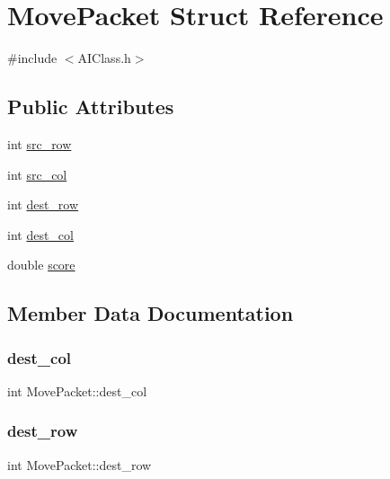 \hypertarget{struct_move_packet}{}\section{Move\+Packet Struct Reference}
\label{struct_move_packet}


{\ttfamily \#include $<$A\+I\+Class.\+h$>$}

\subsection*{Public Attributes}
\begin{DoxyCompactItemize}
\item 
int \hyperlink{struct_move_packet_ac47381c0c93b204e2e9a8251537f0118}{src\+\_\+row}
\item 
int \hyperlink{struct_move_packet_a174bf6f0d24a094e8cd3a8af0547dc9f}{src\+\_\+col}
\item 
int \hyperlink{struct_move_packet_aa4e9c53e9b13bd1e01bcbe36aece9321}{dest\+\_\+row}
\item 
int \hyperlink{struct_move_packet_a76e460ec3c99d9c07e365419bfec9c79}{dest\+\_\+col}
\item 
double \hyperlink{struct_move_packet_ae502e180cfc98f90b24b9d5521f80161}{score}
\end{DoxyCompactItemize}


\subsection{Member Data Documentation}
\mbox{\label{struct_move_packet_a76e460ec3c99d9c07e365419bfec9c79}} 
\subsubsection{\texorpdfstring{dest\+\_\+col}{dest\_col}}
{\footnotesize\ttfamily int Move\+Packet\+::dest\+\_\+col}

\mbox{\label{struct_move_packet_aa4e9c53e9b13bd1e01bcbe36aece9321}} 
\subsubsection{\texorpdfstring{dest\+\_\+row}{dest\_row}}
{\footnotesize\ttfamily int Move\+Packet\+::dest\+\_\+row}

